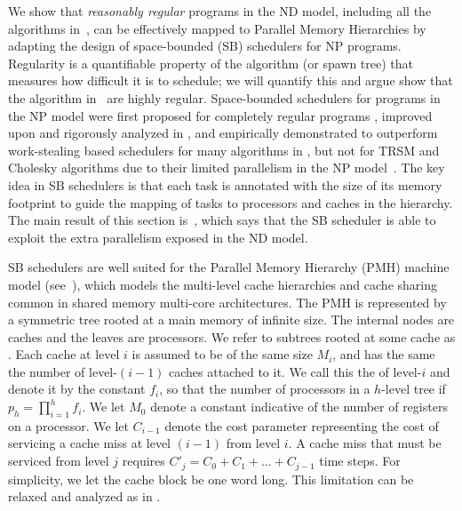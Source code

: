 
We show that {\it reasonably regular} programs in the ND model,
including all the algorithms in~, can be effectively
mapped to Parallel Memory Hierarchies by adapting the design of
space-bounded (SB) schedulers for NP programs. Regularity is a
quantifiable property of the algorithm (or spawn tree) that measures
how difficult it is to schedule; we will quantify this and argue show
that the algorithm in~ are highly regular.  Space-bounded
schedulers for programs in the NP model were first proposed for
completely regular programs \cite{ChowdhurySiBl13}, improved upon and
rigorously analyzed in \cite{BlellochFiGi11}, and empirically
demonstrated to outperform work-stealing based schedulers for many
algorithms in \cite{SimhadriBlFi14}, but not for TRSM and Cholesky
algorithms due to their limited parallelism in the NP
model~\cite{SimhadriBlFi15}. The key idea in SB schedulers is that
each task is annotated with the size of its memory footprint to guide
the mapping of tasks to processors and caches in the hierarchy.  The
main result of this section is~, which says that the SB
scheduler is able to exploit the extra parallelism exposed in the ND
model.

SB schedulers are well suited for the Parallel Memory Hierarchy (PMH)
machine model \cite{ACF93} (see~), which models the
multi-level cache hierarchies and cache sharing common in shared
memory multi-core architectures.  The PMH is represented by a
symmetric tree rooted at a main memory of infinite size. The internal
nodes are caches and the leaves are processors. We refer to subtrees
rooted at some cache as . Each cache at level $i$ is
assumed to be of the same size $M_i$, and has the same the number of
level-$(i-1)$ caches attached to it. We call this the 
of level-$i$ and denote it by the constant $f_i$, so that the number
of processors in a $h$-level tree if $p_h = \prod_{i=1}^{h} f_i$. We
let $M_0$ denote a constant indicative of the number of registers on a
processor. We let $C_{i-1}$ denote the cost parameter representing the
cost of servicing a cache miss at level $(i-1)$ from level $i$. A
cache miss that must be serviced from level $j$ requires $C'_j =
C_0+C_1+\dots+C_{j-1}$ time steps.  For simplicity, we let the cache
block be one word long.  This limitation can be relaxed and analyzed
as in \cite{BlellochFiGi11}.


